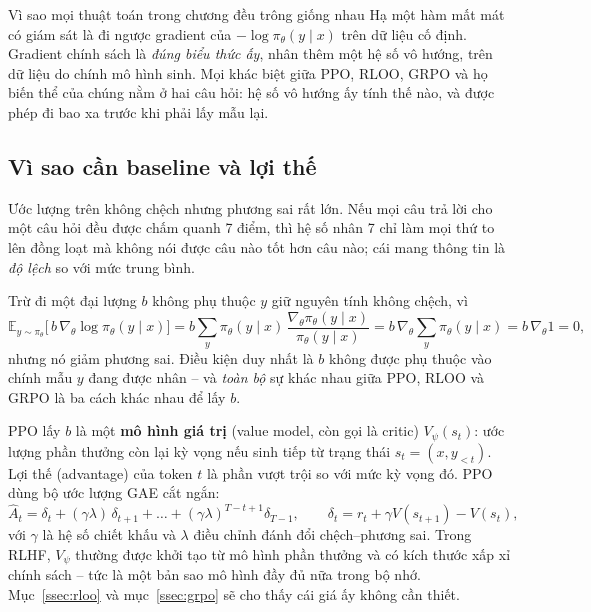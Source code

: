\begin{keyidea}{Vì sao mọi thuật toán trong chương đều trông giống nhau}
Hạ một hàm mất mát có giám sát là đi ngược gradient của $-\log \pi_\theta(y \mid x)$ trên dữ liệu cố định. Gradient chính sách là \emph{đúng biểu thức ấy}, nhân thêm một hệ số vô hướng, trên dữ liệu do chính mô hình sinh. Mọi khác biệt giữa PPO, RLOO, GRPO và họ biến thể của chúng nằm ở hai câu hỏi: hệ số vô hướng ấy tính thế nào, và được phép đi bao xa trước khi phải lấy mẫu lại.
\end{keyidea}

\subsection{Vì sao cần baseline và lợi thế}
\label{ssec:baseline_advantage}

Ước lượng trên không chệch nhưng phương sai rất lớn. Nếu mọi câu trả lời cho một câu hỏi đều được chấm quanh 7 điểm, thì hệ số nhân 7 chỉ làm mọi thứ to lên đồng loạt mà không nói được câu nào tốt hơn câu nào; cái mang thông tin là \emph{độ lệch} so với mức trung bình.

Trừ đi một đại lượng $b$ không phụ thuộc $y$ giữ nguyên tính không chệch, vì
\[
\mathbb{E}_{y \sim \pi_\theta}\big[\,b\,\nabla_{\theta} \log \pi_{\theta}(y\mid x)\big]
= b \sum_y \pi_\theta(y \mid x)\,\frac{\nabla_\theta \pi_\theta(y\mid x)}{\pi_\theta(y \mid x)}
= b\,\nabla_\theta \sum_y \pi_\theta(y \mid x)
= b\,\nabla_\theta 1 = 0 ,
\]
nhưng nó giảm phương sai. Điều kiện duy nhất là $b$ không được phụ thuộc vào chính mẫu $y$ đang được nhân -- và \emph{toàn bộ} sự khác nhau giữa PPO, RLOO và GRPO là ba cách khác nhau để lấy $b$.

PPO lấy $b$ là một \textbf{mô hình giá trị} (value model, còn gọi là critic) $V_{\psi}(s_t)$: ước lượng phần thưởng còn lại kỳ vọng nếu sinh tiếp từ trạng thái $s_t = (x, y_{<t})$. Lợi thế (advantage) của token $t$ là phần vượt trội so với mức kỳ vọng đó. PPO \cite{schulman2017proximal} dùng bộ ước lượng GAE \cite{schulman2016gae} cắt ngắn:
\[
	\hat{A}_t = \delta_t + (\gamma\lambda)\,\delta_{t+1} + \dots + (\gamma\lambda)^{T-t+1}\delta_{T-1},
	\qquad
	\delta_t = r_t + \gamma V(s_{t+1}) - V(s_t),
\]
với $\gamma$ là hệ số chiết khấu và $\lambda$ điều chỉnh đánh đổi chệch--phương sai. Trong RLHF, $V_{\psi}$ thường được khởi tạo từ mô hình phần thưởng và có kích thước xấp xỉ chính sách -- tức là một bản sao mô hình đầy đủ nữa trong bộ nhớ. Mục~\ref{ssec:rloo} và mục~\ref{ssec:grpo} sẽ cho thấy cái giá ấy không cần thiết.


